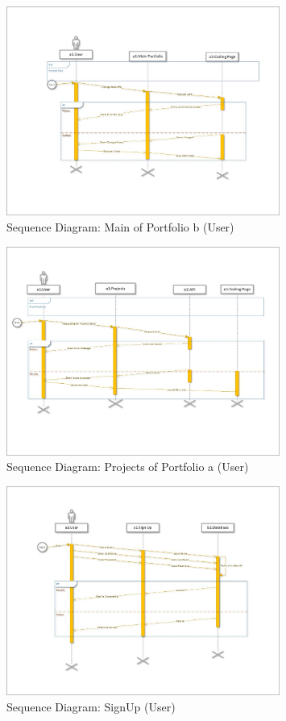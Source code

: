 \documentclass[12pt]{report}
\begin{document}
\begin{figure}[ht]
    \centering
    \includegraphics[width=0.8\textwidth]{Media/s1_Page_23.jpg} %
    \caption{Sequence Diagram: Main of Portfolio b (User)}
    \label{fig:drawing1}
\end{figure}

\begin{figure}[ht]
    \centering
    \includegraphics[width=0.8\textwidth]{Media/s1_Page_24.jpg} %
    \caption{Sequence Diagram: Projects of Portfolio a (User)}
    \label{fig:drawing1}
\end{figure}

\begin{figure}[ht]
    \centering
    \includegraphics[width=0.8\textwidth]{Media/s1_Page_25.jpg} %
    \caption{Sequence Diagram: SignUp (User)}
    \label{fig:drawing1}
\end{figure}
\end{document}
